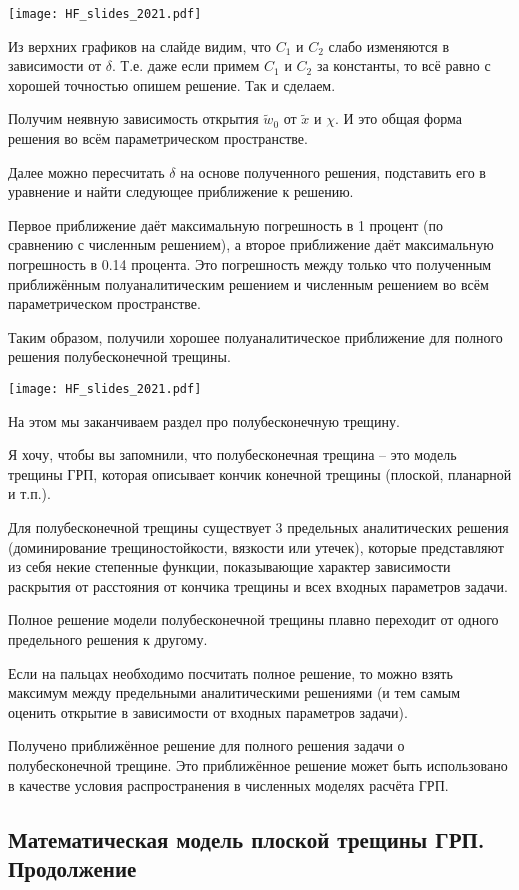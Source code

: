 \documentclass[main.tex]{subfiles}
\begin{document}
\texttt{[image: HF\_slides\_2021.pdf]}

Из верхних графиков на слайде видим, что $C_1$ и $C_2$ слабо изменяются в зависимости от $\delta$.
Т.е. даже если примем $C_1$ и $C_2$ за константы, то всё равно с хорошей точностью опишем решение.
Так и сделаем.

Получим неявную зависимость открытия $\tilde{w}_0$ от $\tilde{x}$ и $\chi$.
И это общая форма решения во всём параметрическом пространстве.

Далее можно пересчитать $\delta$ на основе полученного решения, подставить его в уравнение и найти следующее приближение к решению.

Первое приближение даёт максимальную погрешность в 1 процент (по сравнению с численным решением), а второе приближение даёт максимальную погрешность в 0.14 процента.
Это погрешность между только что полученным приближённым полуаналитическим решением и численным решением во всём параметрическом пространстве.

Таким образом, получили хорошее полуаналитическое приближение для полного решения полубесконечной трещины.

\texttt{[image: HF\_slides\_2021.pdf]}

На этом мы заканчиваем раздел про полубесконечную трещину.

Я хочу, чтобы вы запомнили, что полубесконечная трещина -- это модель трещины ГРП, которая описывает кончик конечной трещины (плоской, планарной и т.п.).

Для полубесконечной трещины существует 3 предельных аналитических решения (доминирование трещиностойкости, вязкости или утечек), которые представляют из себя некие степенные функции, показывающие характер зависимости раскрытия от расстояния от кончика трещины и всех входных параметров задачи.

Полное решение модели полубесконечной трещины плавно переходит от одного предельного решения к другому.

Если на пальцах необходимо посчитать полное решение, то можно взять максимум между предельными аналитическими решениями (и тем самым оценить открытие в зависимости от входных параметров задачи).

Получено приближённое решение для полного решения задачи о полубесконечной трещине.
Это приближённое решение может быть использовано в качестве условия распространения в численных моделях расчёта ГРП.

\subsection{Математическая модель плоской трещины ГРП. Продолжение}
\end{document}
